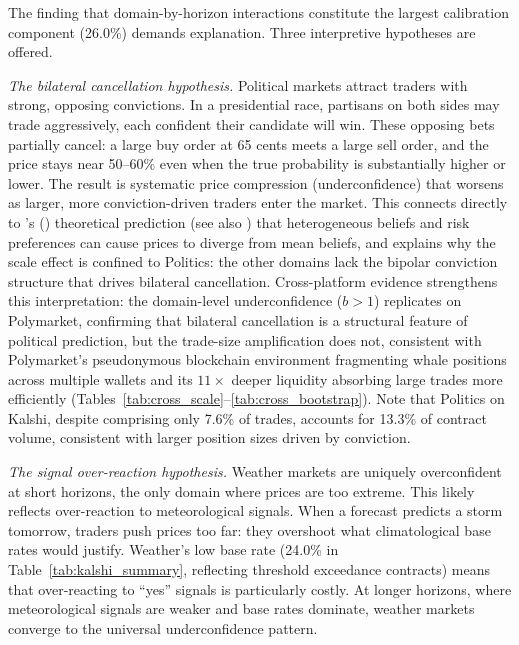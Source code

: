 \documentclass[numsec,webpdf,modern,medium]{oup-authoring-template}
\theoremstyle{thmstyleone}%
\theoremstyle{thmstyletwo}%
\theoremstyle{thmstylethree}%
\begin{document}
The finding that domain-by-horizon interactions constitute the largest calibration component (26.0\%) demands explanation. Three interpretive hypotheses are offered.

\emph{The bilateral cancellation hypothesis.} Political markets attract traders with strong, opposing convictions. In a presidential race, partisans on both sides may trade aggressively, each confident their candidate will win. These opposing bets partially cancel: a large buy order at 65 cents meets a large sell order, and the price stays near 50--60\% even when the true probability is substantially higher or lower. The result is systematic price compression (underconfidence) that worsens as larger, more conviction-driven traders enter the market. This connects directly to \citeauthor{manski2006interpreting}'s (\citeyear{manski2006interpreting}) theoretical prediction (see also \citealp{ottaviani2008favorite}) that heterogeneous beliefs and risk preferences can cause prices to diverge from mean beliefs, and explains why the scale effect is confined to Politics: the other domains lack the bipolar conviction structure that drives bilateral cancellation. Cross-platform evidence strengthens this interpretation: the domain-level underconfidence ($b > 1$) replicates on Polymarket, confirming that bilateral cancellation is a structural feature of political prediction, but the trade-size amplification does not, consistent with Polymarket's pseudonymous blockchain environment fragmenting whale positions across multiple wallets and its $11\times$ deeper liquidity absorbing large trades more efficiently (Tables~\ref{tab:cross_scale}--\ref{tab:cross_bootstrap}). Note that Politics on Kalshi, despite comprising only 7.6\% of trades, accounts for 13.3\% of contract volume, consistent with larger position sizes driven by conviction.

\emph{The signal over-reaction hypothesis.} Weather markets are uniquely overconfident at short horizons, the only domain where prices are too extreme. This likely reflects over-reaction to meteorological signals. When a forecast predicts a storm tomorrow, traders push prices too far: they overshoot what climatological base rates would justify. Weather's low base rate (24.0\% in Table~\ref{tab:kalshi_summary}, reflecting threshold exceedance contracts) means that over-reacting to ``yes'' signals is particularly costly. At longer horizons, where meteorological signals are weaker and base rates dominate, weather markets converge to the universal underconfidence pattern.
\end{document}
